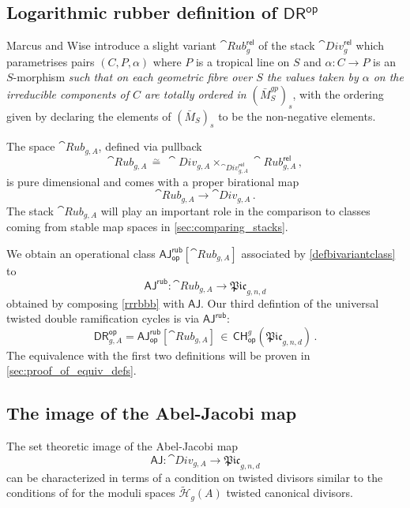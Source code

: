 \documentclass[a4paper,12pt]{article} %
\def\HH{\mathcal{H}}
\theoremstyle{definition}
\theoremstyle{plain}%
\newcommand{\aj}{{\scriptstyle \mathsf{AJ}}}
\newcommand{\Picabs}{\mathfrak{Pic}}
\newcommand{\DRop}{\mathsf{DR}^{\mathsf{op}}}
\begin{document}
\subsection{Logarithmic rubber definition of \texorpdfstring{$\DRop$}{DR\^{}op}}\label{sec:rub_log_def}
Marcus and Wise introduce a slight variant $\cat{Rub}^{\mathsf{rel}}_{g}$ of the stack $\cat{Div}^{\mathsf{rel}}_{g}$
which
parametrises pairs $(C,P, \alpha)$ where $P$ is a tropical line on $S$ and $\alpha\colon C \to P$ is an $S$-morphism \emph{such that on each geometric fibre over $S$ the values taken by $\alpha$ on the irreducible components of $C$ are totally ordered in $(\bar{M}_S^{gp})_s$}, with the ordering given by declaring the elements of $(\bar{M}_S)_s$ to be the non-negative elements. 

The space $\cat{Rub}_{g,A}$,
defined via pullback
$$
\cat{Rub}_{g,A} \, \stackrel{\sim}{=}\, 
\cat{Div}_{g,A}
\times_{\cat{Div}^{\mathsf{rel}}
_{g,A}} 
\cat{Rub}^{\mathsf{rel}}_{g,A}\, ,$$
is pure dimensional and comes with a proper birational map 
\begin{equation}\label{rrrbbb}
\cat{Rub}_{g,A} \to \cat{Div}_{g,A}\, .
\end{equation}
The stack $\cat{Rub}_{g,A}$  will 
play an important role in the comparison to classes coming from stable map spaces in \cref{sec:comparing_stacks}. 


We obtain an operational class $\aj^{\mathsf{rub}}_{\mathsf{op}}[\cat{Rub}_{g,A}]$ associated by \cref{defbivariantclass} to 
$$\aj^{\mathsf{rub}}: \cat{Rub}_{g,A} \to \Picabs_{g,n,d}$$
obtained by composing \eqref{rrrbbb} with $\aj$.
Our third defintion of the universal twisted double ramification
cycles is via $\aj^{\mathsf{rub}}$:
\begin{equation}%
\DRop_{g,A} = \aj^{\mathsf{rub}}_{\mathsf{op}}[\cat{Rub}_{g,A}] \, \in\, 
\mathsf{CH}^g_{\mathsf{op}}(\Picabs_{g,n,d})
\, . 
\end{equation}
The equivalence with the first two 
definitions will be proven in \cref{sec:proof_of_equiv_defs}. 


\subsection{The image of the Abel-Jacobi map}\label{sec:image_of_aj}
The set theoretic image of the Abel-Jacobi map 
$$\aj\colon \cat{Div}_{g, A} \to \Picabs_{g,n,d}$$ 
can be characterized 
in terms of a condition on twisted divisors similar to the 
conditions of \cite{Farkas2016The-moduli-spac} for the moduli spaces $\widetilde{\HH}_g(A)$
twisted
canonical divisors.
\end{document}
